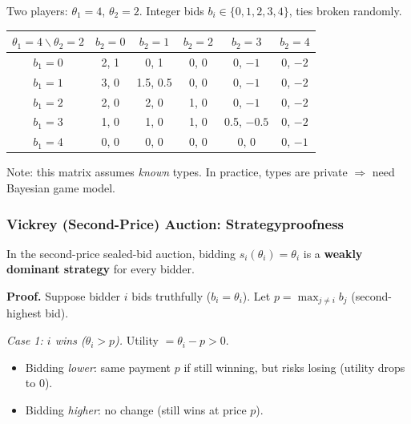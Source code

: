 \begin{exbox}
Two players: $\theta_1 = 4$, $\theta_2 = 2$. Integer bids $b_i \in \{0,1,2,3,4\}$, ties broken randomly.

\begin{center}
\small
\begin{tabular}{c|ccccc}
$\theta_1{=}4 \backslash \theta_2{=}2$ & $b_2{=}0$ & $b_2{=}1$ & $b_2{=}2$ & $b_2{=}3$ & $b_2{=}4$ \\
\hline
$b_1{=}0$ & 2, 1   & 0, 1     & 0, 0     & 0, $-1$  & 0, $-2$ \\
$b_1{=}1$ & 3, 0   & 1.5, 0.5 & 0, 0     & 0, $-1$  & 0, $-2$ \\
$b_1{=}2$ & 2, 0   & 2, 0     & 1, 0     & 0, $-1$  & 0, $-2$ \\
$b_1{=}3$ & 1, 0   & 1, 0     & 1, 0     & 0.5, $-0.5$ & 0, $-2$ \\
$b_1{=}4$ & 0, 0   & 0, 0     & 0, 0     & 0, 0     & 0, $-1$ \\
\end{tabular}
\end{center}

Note: this matrix assumes \emph{known} types. In practice, types are private $\Rightarrow$ need Bayesian game model.
\end{exbox}

\separator

\subsubsection{Vickrey (Second-Price) Auction: Strategyproofness}

\begin{thmbox}
In the second-price sealed-bid auction, bidding $s_i(\theta_i) = \theta_i$ is a \textbf{weakly dominant strategy} for every bidder.
\end{thmbox}

\textbf{Proof.} Suppose bidder $i$ bids truthfully ($b_i = \theta_i$). Let $p = \max_{j \neq i} b_j$ (second-highest bid).

\emph{Case 1: $i$ wins ($\theta_i > p$).} Utility $= \theta_i - p > 0$.
\begin{itemize}
  \item Bidding \emph{lower}: same payment $p$ if still winning, but risks losing (utility drops to 0).
  \item Bidding \emph{higher}: no change (still wins at price $p$).
\end{itemize}

